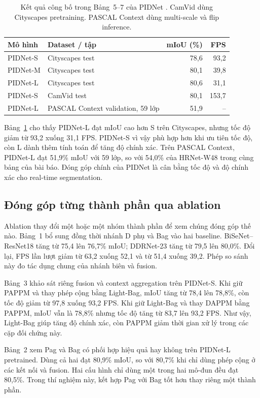 \begin{table}[htbp]
\centering\small
\begin{tabularx}{\linewidth}{@{}Xlrr@{}}
\toprule
Mô hình & Dataset / tập & mIoU (\%) & FPS\\
\midrule
PIDNet-S & Cityscapes test & 78,6 & 93,2\\
PIDNet-M & Cityscapes test & 80,1 & 39,8\\
PIDNet-L & Cityscapes test & 80,6 & 31,1\\
PIDNet-S & CamVid test & 80,1 & 153,7\\
PIDNet-L & PASCAL Context validation, 59 lớp & 51,9 & --\\
\bottomrule
\end{tabularx}
\caption{Kết quả công bố trong Bảng~5--7 của PIDNet \cite{pidnet}. CamVid dùng Cityscapes pretraining. PASCAL Context dùng multi-scale và flip inference.}
\label{tab:paper-main-results}
\end{table}

Bảng~\ref{tab:paper-main-results} cho thấy PIDNet-L đạt mIoU cao hơn S trên Cityscapes, nhưng tốc độ giảm từ 93,2 xuống 31,1 FPS. PIDNet-S vì vậy phù hợp hơn khi ưu tiên tốc độ, còn L dành thêm tính toán để tăng độ chính xác. Trên PASCAL Context, PIDNet-L đạt 51,9\% mIoU với 59 lớp, so với 54,0\% của HRNet-W48 trong cùng bảng của bài báo. Đóng góp chính của PIDNet là cân bằng tốc độ và độ chính xác cho real-time segmentation.

\subsection{Đóng góp từng thành phần qua ablation}
Ablation thay đổi một hoặc một nhóm thành phần để xem chúng đóng góp thế nào. Bảng~1 bổ sung đồng thời nhánh D phụ và Bag vào hai baseline. BiSeNet--ResNet18 tăng từ 75,4 lên 76,7\% mIoU; DDRNet-23 tăng từ 79,5 lên 80,0\%. Đổi lại, FPS lần lượt giảm từ 63,2 xuống 52,1 và từ 51,4 xuống 39,2. Phép so sánh này đo tác dụng chung của nhánh biên và fusion.

Bảng~3 khảo sát riêng fusion và context aggregation trên PIDNet-S. Khi giữ PAPPM và thay phép cộng bằng Light-Bag, mIoU tăng từ 78,4 lên 78,8\%, còn tốc độ giảm từ 97,8 xuống 93,2 FPS. Khi giữ Light-Bag và thay DAPPM bằng PAPPM, mIoU vẫn là 78,8\% nhưng tốc độ tăng từ 83,7 lên 93,2 FPS. Như vậy, Light-Bag giúp tăng độ chính xác, còn PAPPM giảm thời gian xử lý trong các cặp đối chứng này.

Bảng~2 xem Pag và Bag có phối hợp hiệu quả hay không trên PIDNet-L pretrained. Dùng cả hai đạt 80,9\% mIoU, so với 80,7\% khi chỉ dùng phép cộng ở các kết nối và fusion. Hai cấu hình chỉ dùng một trong hai mô-đun đều đạt 80,5\%. Trong thí nghiệm này, kết hợp Pag với Bag tốt hơn thay riêng một thành phần.

